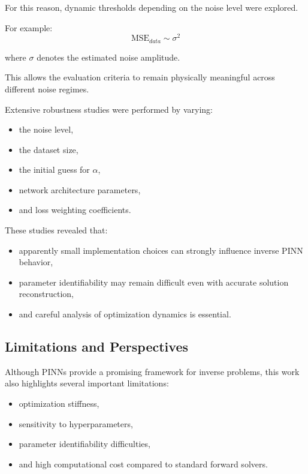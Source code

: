 For this reason, dynamic thresholds depending on the noise level were explored.

For example:
\begin{equation}
\text{MSE}_{data}
\sim
\sigma^2
\end{equation}

where $\sigma$ denotes the estimated noise amplitude.

This allows the evaluation criteria to remain physically meaningful across different noise regimes.

Extensive robustness studies were performed by varying:
\begin{itemize}
    \item the noise level,
    \item the dataset size,
    \item the initial guess for $\alpha$,
    \item network architecture parameters,
    \item and loss weighting coefficients.
\end{itemize}

These studies revealed that:
\begin{itemize}
    \item apparently small implementation choices can strongly influence inverse PINN behavior,
    \item parameter identifiability may remain difficult even with accurate solution reconstruction,
    \item and careful analysis of optimization dynamics is essential.
\end{itemize}

\subsection{Limitations and Perspectives}

Although PINNs provide a promising framework for inverse problems, this work also highlights several important limitations:
\begin{itemize}
    \item optimization stiffness,
    \item sensitivity to hyperparameters,
    \item parameter identifiability difficulties,
    \item and high computational cost compared to standard forward solvers.
\end{itemize}


